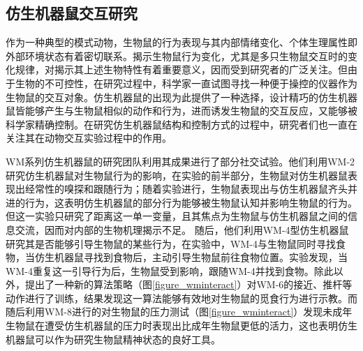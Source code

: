 \subsection{仿生机器鼠交互研究}
作为一种典型的模式动物，生物鼠的行为表现与其内部情绪变化、个体生理属性即外部环境状态有着密切联系。揭示生物鼠行为变化，尤其是多只生物鼠交互时的变化规律，对揭示其上述生物特性有着重要意义，因而受到研究者的广泛关注。但由于生物的不可控性，在研究过程中，科学家一直试图寻找一种便于操控的仪器作为生物鼠的交互对象。仿生机器鼠的出现为此提供了一种选择，设计精巧的仿生机器鼠皆能够产生与生物鼠相似的动作和行为，进而诱发生物鼠的交互反应，又能够被科学家精确控制。在研究仿生机器鼠结构和控制方式的过程中，研究者们也一直在关注其在动物交互实验过程中的作用。

WM系列仿生机器鼠的研究团队利用其成果进行了部分社交试验。他们利用WM-2研究仿生机器鼠对生物鼠行为的影响，在实验的前半部分，生物鼠对仿生机器鼠表现出经常性的嗅探和跟随行为；随着实验进行，生物鼠表现出与仿生机器鼠齐头并进的行为，这表明仿生机器鼠的部分行为能够被生物鼠认知并影响生物鼠的行为\cite{takanishiInteractionCreatureRobot1998}。但这一实验只研究了距离这一单一变量，且其焦点为生物鼠与仿生机器鼠之间的信息交流，因而对内部的生物机理揭示不足。
随后，他们利用WM-4型仿生机器鼠研究其是否能够引导生物鼠的某些行为，在实验中，WM-4与生物鼠同时寻找食物，当仿生机器鼠寻找到食物后，主动引导生物鼠前往食物位置。实验发现，当WM-4重复这一引导行为后，生物鼠受到影响，跟随WM-4并找到食物\cite{aokiInteractionRatRatrobots1999}。除此以外，\citeauthor{ishiiExperimentalStudyTask2006}提出了一种新的算法策略（图\ref{figure_wminteract}）对WM-6的接近、推杆等动作进行了训练，结果发现这一算法能够有效地对生物鼠的觅食行为进行示教\cite{ishiiExperimentalStudyTask2006}。而随后利用WM-8进行的对生物鼠的压力测试（图\ref{figure_wminteract}）发现未成年生物鼠在遭受仿生机器鼠的压力时表现出比成年生物鼠更低的活力\cite{ishiiStressExposureUsing2012}，这也表明仿生机器鼠可以作为研究生物鼠精神状态的良好工具。
